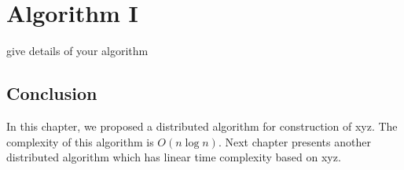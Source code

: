 \chapter{Algorithm I}

give details of your algorithm

\section{Conclusion}
In this chapter, we proposed a distributed algorithm
for construction of xyz.
The complexity of this algorithm is $O(n \log n)$.
Next chapter presents
another distributed algorithm which has linear time 
complexity based on xyz.

